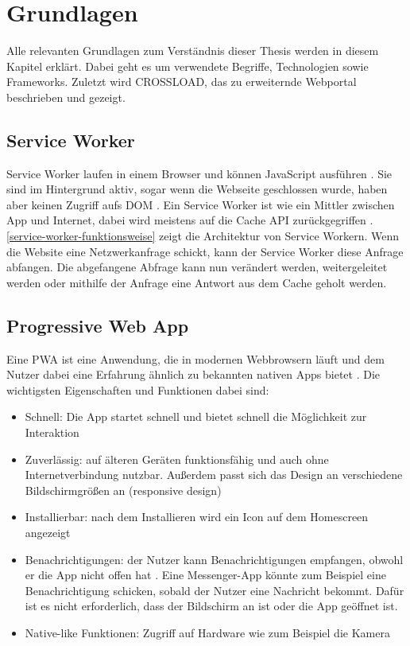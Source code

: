 \chapter{Grundlagen}
\label{Kap2}
Alle relevanten Grundlagen zum Verständnis dieser Thesis werden in diesem Kapitel erklärt. Dabei geht es um verwendete Begriffe, Technologien sowie Frameworks. Zuletzt wird CROSSLOAD, das zu erweiternde Webportal beschrieben und gezeigt.

\section{Service Worker}
Service Worker laufen in einem Browser und können JavaScript ausführen \autocite{Sheppard2017}. Sie sind im Hintergrund aktiv, sogar wenn die Webseite geschlossen wurde, haben aber keinen Zugriff aufs \ac{DOM} \autocite{Sheppard2017}. Ein Service Worker ist wie ein Mittler zwischen App und Internet, dabei wird meistens auf die Cache \ac{API} zurückgegriffen \autocite{Sheppard2017}. \autoref{service-worker-funktionsweise} zeigt die Architektur von Service Workern. Wenn die Website eine Netzwerkanfrage schickt, kann der Service Worker diese Anfrage abfangen. Die abgefangene Abfrage kann nun verändert werden, weitergeleitet werden oder mithilfe der Anfrage eine Antwort aus dem Cache geholt werden.


\section{Progressive Web App}
Eine \ac{PWA} ist eine Anwendung, die in modernen Webbrowsern läuft und dem Nutzer dabei eine Erfahrung ähnlich zu bekannten nativen Apps bietet \autocite{Sheppard2017} \autocite{Rojas2020}. Die wichtigsten Eigenschaften und Funktionen dabei sind:

\begin{itemize}
  \item Schnell: Die App startet schnell und bietet schnell die Möglichkeit zur Interaktion \autocite{Hajian2019} \autocite{Sheppard2017}
  \item Zuverlässig: auf älteren Geräten funktionsfähig und auch ohne Internetverbindung nutzbar. Außerdem passt sich das Design an verschiedene Bildschirmgrößen an (responsive design) \autocite{Hajian2019} \autocite{Sheppard2017}
  \item Installierbar: nach dem Installieren wird ein Icon auf dem Homescreen angezeigt \autocite{Hajian2019} \autocite{Sheppard2017} \autocite{Rojas2020}
  \item Benachrichtigungen: der Nutzer kann Benachrichtigungen empfangen, obwohl er die App nicht offen hat \autocite{Hajian2019} \autocite{Sheppard2017}. Eine Messenger-App könnte zum Beispiel eine Benachrichtigung schicken, sobald der Nutzer eine Nachricht bekommt. Dafür ist es nicht erforderlich, dass der Bildschirm an ist oder die App geöffnet ist.
  \item Native-like Funktionen: Zugriff auf Hardware wie zum Beispiel die Kamera \autocite{Hajian2019}
\end{itemize}

